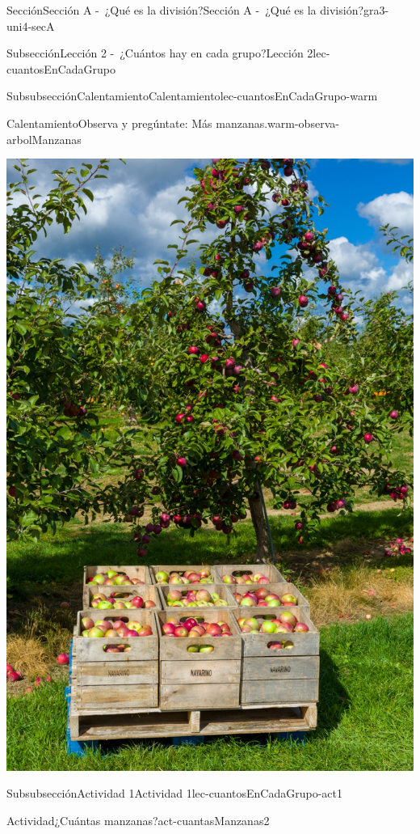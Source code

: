 \documentclass[twoside,10pt,]{article}
\begin{document}
\begin{sectionptx}{Sección}{Sección A -~¿Qué es la división?}{}{Sección A -~¿Qué es la división?}{}{}{gra3-uni4-secA}
\begin{subsectionptx}{Subsección}{Lección 2 -~¿Cuántos hay en cada grupo?}{}{Lección 2}{}{}{lec-cuantosEnCadaGrupo}
\begin{subsubsectionptx}{Subsubsección}{Calentamiento}{}{Calentamiento}{}{}{lec-cuantosEnCadaGrupo-warm}
\begin{exploration}{Calentamiento}{Observa y pregúntate: Más manzanas.}{warm-observa-arbolManzanas}
\begin{image}{0.15}{0.7}{0.15}{}
\includegraphics[width=\linewidth]{external/jpg-source/3.4.A2 Warm-up.jpg}
\end{image}%
\end{exploration}%
%
\end{subsubsectionptx}
%
%
\typeout{************************************************}
\typeout{************************************************}
%
\begin{subsubsectionptx}{Subsubsección}{Actividad 1}{}{Actividad 1}{}{}{lec-cuantosEnCadaGrupo-act1}
\begin{activity}{Actividad}{¿Cuántas manzanas?}{act-cuantasManzanas2}%

\end{activity}
\end{subsubsectionptx}
\end{subsectionptx}
\end{sectionptx}
\end{document}
